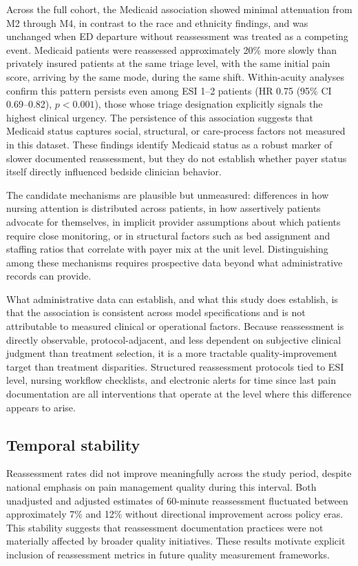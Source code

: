 \documentclass[11pt]{article}
\newcommand{\HRMedicaidESIhigh}{0.75 (95\% CI 0.69--0.82), $p<0.001$}
\begin{document}
Across the full cohort, the Medicaid association showed minimal attenuation from M2 through M4, in contrast to the race and ethnicity findings, and was unchanged when ED departure without reassessment was treated as a competing event.
Medicaid patients were reassessed approximately 20\% more slowly than privately insured patients at the same triage level, with the same initial pain score, arriving by the same mode, during the same shift.
Within-acuity analyses confirm this pattern persists even among ESI 1--2 patients (HR \HRMedicaidESIhigh{}), those whose triage designation explicitly signals the highest clinical urgency.
The persistence of this association suggests that Medicaid status captures social, structural, or care-process factors not measured in this dataset.
These findings identify Medicaid status as a robust marker of slower documented reassessment, but they do not establish whether payer status itself directly influenced bedside clinician behavior.

The candidate mechanisms are plausible but unmeasured: differences in how nursing attention is distributed across patients, in how assertively patients advocate for themselves, in implicit provider assumptions about which patients require close monitoring, or in structural factors such as bed assignment and staffing ratios that correlate with payer mix at the unit level.
Distinguishing among these mechanisms requires prospective data beyond what administrative records can provide.

What administrative data can establish, and what this study does establish, is that the association is consistent across model specifications and is not attributable to measured clinical or operational factors.
Because reassessment is directly observable, protocol-adjacent, and less dependent on subjective clinical judgment than treatment selection, it is a more tractable quality-improvement target than treatment disparities.
Structured reassessment protocols tied to ESI level, nursing workflow checklists, and electronic alerts for time since last pain documentation are all interventions that operate at the level where this difference appears to arise.

\subsection{Temporal stability}

Reassessment rates did not improve meaningfully across the study period, despite national emphasis on pain management quality during this interval.
Both unadjusted and adjusted estimates of 60-minute reassessment fluctuated between approximately 7\% and 12\% without directional improvement across policy eras.
This stability suggests that reassessment documentation practices were not materially affected by broader quality initiatives.
These results motivate explicit inclusion of reassessment metrics in future quality measurement frameworks.
\end{document}
